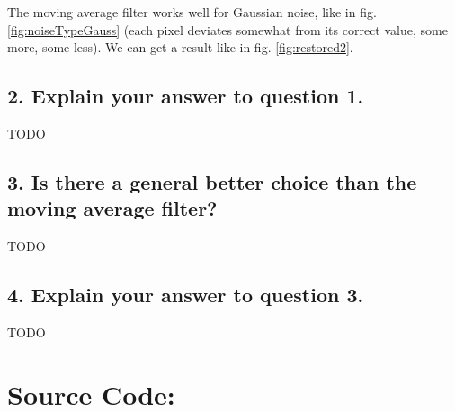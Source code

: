 \documentclass[a4paper,headings=small]{scrartcl}
\numberwithin{equation}{section} %
\numberwithin{figure}{section}   %
\begin{document}
The moving average filter works well for Gaussian noise,
like in fig. \ref{fig:noiseTypeGauss}
(each pixel deviates somewhat from its correct value, some more, some less).
We can get a result like in fig. \ref{fig:restored2}.


\subsection{2. Explain your answer to question 1.}

TODO


\subsection{3. Is there a general better choice than the moving average filter?}

TODO


\subsection{4. Explain your answer to question 3.}

TODO


\newpage
\section{Source Code:}


\end{document}
